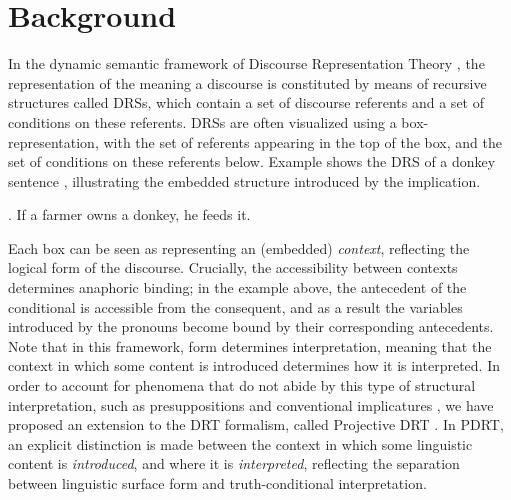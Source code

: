 \section{Background}\label{sec:background}

In the dynamic semantic framework of Discourse Representation Theory
, the representation of the meaning
a discourse is constituted by means of recursive structures called DRSs,
which contain a set of discourse referents and a set of conditions on these
referents. DRSs are often visualized using a box-representation, with the
set of referents appearing in the top of the box, and the set of conditions
on these referents below.  Example \Next shows the DRS of a donkey sentence
, illustrating the embedded structure
introduced by the implication.

\ex. If a farmer owns a donkey, he feeds it.\\

Each box can be seen as representing an (embedded) \emph{context},
reflecting the logical form of the discourse.  Crucially, the accessibility
between contexts determines anaphoric binding; in the example above, the
antecedent of the conditional is accessible from the consequent, and as
a result the variables introduced by the pronouns become bound by their
corresponding antecedents. Note that in this framework, form determines
interpretation, meaning that the context in which some content is introduced
determines how it is interpreted. In order to account for phenomena that do
not abide by this type of structural interpretation, such as presuppositions
and conventional implicatures , we have
proposed an extension to the DRT formalism, called Projective DRT
. In PDRT, an
explicit distinction is made between the context in which some linguistic
content is \textit{introduced}, and where it is \textit{interpreted},
reflecting the separation between linguistic surface form and
truth-conditional interpretation.

